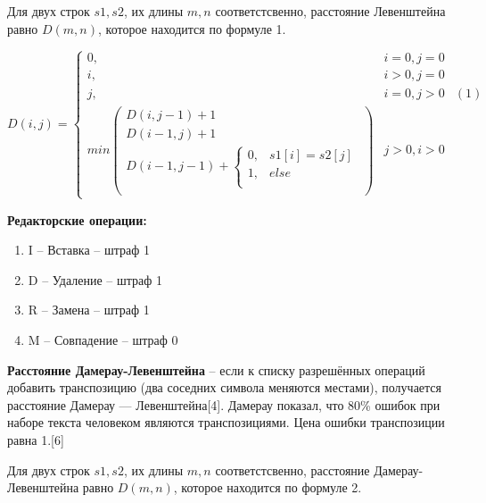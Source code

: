 \documentclass[a4paper,14pt]{article} %
\begin{document}
        \hfill
        
        Для двух строк $s1, s2$, их длины $m, n$ соответстсвенно, расстояние Левенштейна равно $D(m, n)$, которое находится по формуле 1. 
        
        $$
        D(i, j) = 
        \left\{
		\begin{array}{lll}
 			0 , & i = 0, j = 0  \\
			i , & i > 0, j = 0  \\
			j , &i = 0, j > 0 & (1)\\
			min
			\left(
				\begin{array}{lll}
					D(i, j - 1) + 1 \\
					D(i - 1, j ) + 1 \\
					D(i - 1 , j - 1) +  
								\left\{
									\begin{array}{lll}
										0, & s1[i] = s2[j] \\
										1, & else \\
									\end{array}
								\right.\\
				\end{array}
			\right) & j > 0, i > 0
 		\end{array}
	\right.
        $$
         
        \hfill
        
        \textbf{Редакторские операции: }
	\begin{enumerate}
	 	\item I -- Вставка -- штраф 1
	 	\item D -- Удаление -- штраф 1
 	 	\item R -- Замена -- штраф 1
	 	\item M -- Совпадение -- штраф 0
	\end{enumerate}
	
	\hfill
	
	\textbf{Расстояние Дамерау-Левенштейна} -- если к списку разрешённых операций добавить транспозицию (два соседних символа меняются местами), получается расстояние Дамерау — Левенштейна[4]. Дамерау показал, что 80\%  ошибок при наборе текста человеком являются транспозициями. Цена ошибки транспозиции равна 1.[6] 
	
	\hfill
	
	Для двух строк $s1, s2$, их длины $m, n$ соответстсвенно, расстояние Дамерау-Левенштейна равно $D(m, n)$, которое находится по формуле 2. 
        
\end{document}
